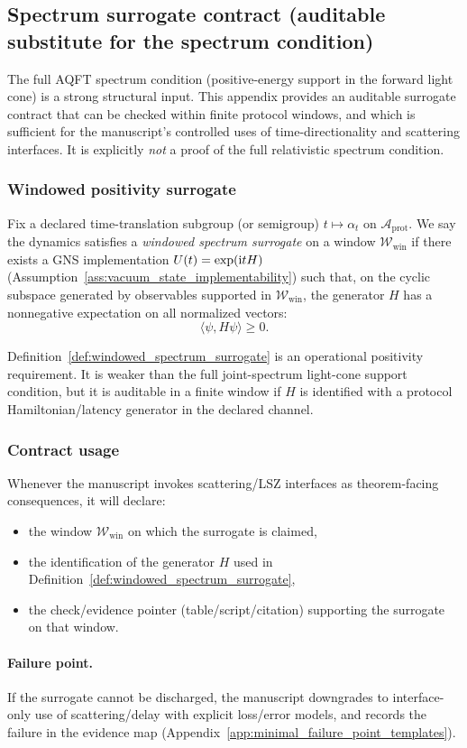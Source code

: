 \subsection{Spectrum surrogate contract (auditable substitute for the spectrum condition)}
\label{app:spectrum_surrogate_contract}

\AuditTag The full AQFT spectrum condition (positive-energy support in the forward light cone) is a strong structural input.
This appendix provides an auditable surrogate contract that can be checked within finite protocol windows, and which is sufficient for the manuscript's controlled uses of time-directionality and scattering interfaces.
It is explicitly \emph{not} a proof of the full relativistic spectrum condition.

\subsubsection{Windowed positivity surrogate}
\begin{definition}
\label{def:windowed_spectrum_surrogate}
\MathTag Fix a declared time-translation subgroup (or semigroup) $t\mapsto \alpha_t$ on $\mathcal{A}_{\mathrm{prot}}$.
We say the dynamics satisfies a \emph{windowed spectrum surrogate} on a window $\mathcal{W}_{\mathrm{win}}$ if there exists a GNS implementation $U(t)=\exp(\mathrm{i} tH)$ (Assumption~\ref{ass:vacuum_state_implementability}) such that, on the cyclic subspace generated by observables supported in $\mathcal{W}_{\mathrm{win}}$, the generator $H$ has a nonnegative expectation on all normalized vectors:
\[
\langle \psi, H\psi\rangle \ge 0.
\]
\end{definition}

\AuditTag Definition~\ref{def:windowed_spectrum_surrogate} is an operational positivity requirement.
It is weaker than the full joint-spectrum light-cone support condition, but it is auditable in a finite window if $H$ is identified with a protocol Hamiltonian/latency generator in the declared channel.

\subsubsection{Contract usage}
\begin{assumption}
\label{ass:spectrum_surrogate_contract}
Whenever the manuscript invokes scattering/LSZ interfaces as theorem-facing consequences, it will declare:
\begin{itemize}
\item the window $\mathcal{W}_{\mathrm{win}}$ on which the surrogate is claimed,
\item the identification of the generator $H$ used in Definition~\ref{def:windowed_spectrum_surrogate},
\item the check/evidence pointer (table/script/citation) supporting the surrogate on that window.
\end{itemize}
\end{assumption}

\paragraph{Failure point.}
\AuditTag If the surrogate cannot be discharged, the manuscript downgrades to interface-only use of scattering/delay with explicit loss/error models, and records the failure in the evidence map (Appendix~\ref{app:minimal_failure_point_templates}).

